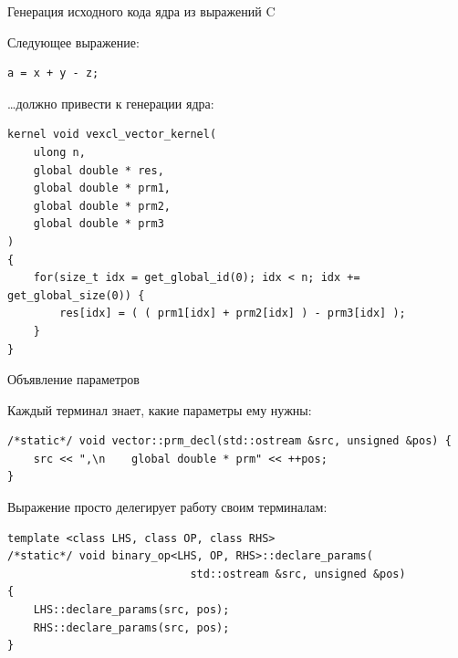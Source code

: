 \documentclass[@BEAMER_OPTIONS@]{beamer}
\newcommand{\CXX}{{\rm C}\plusplus}
\begin{document}
\note{ }

\begin{frame}[fragile]{Генерация исходного кода ядра из выражений \CXX}
    \begin{exampleblock}{Следующее выражение:}
        \begin{lstlisting}
a = x + y - z;
        \end{lstlisting}
    \end{exampleblock}
    \begin{exampleblock}{\ldots должно привести к генерации ядра:}
        \begin{lstlisting}
kernel void vexcl_vector_kernel(
    ulong n,
    global double * res,
    global double * prm1,
    global double * prm2,
    global double * prm3
)
{
    for(size_t idx = get_global_id(0); idx < n; idx += get_global_size(0)) {
        res[idx] = ( ( prm1[idx] + prm2[idx] ) - prm3[idx] );
    }
}
        \end{lstlisting}
    \end{exampleblock}
\end{frame}

\note{ }

\begin{frame}[fragile]{Объявление параметров}
    \begin{exampleblock}{Каждый терминал знает, какие параметры ему нужны:}
        \begin{lstlisting}
/*static*/ void vector::prm_decl(std::ostream &src, unsigned &pos) {
    src << ",\n    global double * prm" << ++pos;
}
        \end{lstlisting}
    \end{exampleblock}
    \begin{exampleblock}{Выражение просто делегирует работу своим терминалам:}
        \begin{lstlisting}[firstnumber=last]
template <class LHS, class OP, class RHS>
/*static*/ void binary_op<LHS, OP, RHS>::declare_params(
                            std::ostream &src, unsigned &pos)
{
    LHS::declare_params(src, pos);
    RHS::declare_params(src, pos);
}
        \end{lstlisting}
    \end{exampleblock}
\end{frame}
\end{document}
